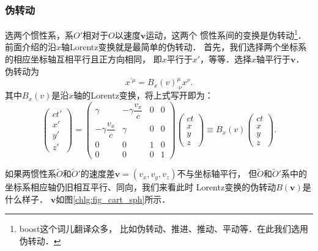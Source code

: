 \subsubsection{伪转动}
选两个惯性系，系$O'$相对于$O$以速度$\boldsymbol{v}$运动，这两个
惯性系间的变换是伪转动{\footnote{boost这个词儿翻译众多，
        比如伪转动、推进、推动、平动等．在此我们选用伪转动．}}．
前面介绍的沿$x$轴Lorentz变换就是最简单的伪转动．
首先，我们选择两个坐标系的相应坐标轴互相平行且正方向相同，
即$x$平行于$x'$，等等．选择$x$轴平行于$\boldsymbol{v}$．
伪转动为
\begin{equation}\label{chlg:eqn_lorentz-matrix-b}
    x^{\prime \mu} = B_x({v}) ^\mu _{\cdot \nu} x^\nu .
\end{equation}
其中$B_x({v})$是沿$x$轴的Lorentz变换，将上式写开即为：
\begin{equation}\label{chlg:eqn_lorentz-transofrm-x-MatrixForm}
	\begin{pmatrix}
		ct'\\x'\\y'\\z'
	\end{pmatrix} =
	\begin{pmatrix}
		\gamma & -\gamma \dfrac{v_x}{c}  & 0 & 0 \\
		-\gamma \dfrac{v_x}{c} & \gamma  & 0 & 0 \\
		0 & 0 & 1 & 0 \\
		0 & 0 & 0 & 1
	\end{pmatrix}
	\begin{pmatrix}
		ct\\x\\y\\z
	\end{pmatrix} \equiv B_x({v})
	\begin{pmatrix}
		ct\\x\\y\\z
	\end{pmatrix}.
\end{equation}





如果两惯性系$\tilde{O}$和$\tilde{O}'$的速度差$\boldsymbol{v}=(v_x,v_y,v_z)$不与坐标轴平行，
但$\tilde{O}$和$\tilde{O}'$系中的坐标系相应轴仍旧相互平行、同向，我们来看此时
Lorentz变换的伪转动$B(\boldsymbol{v})$是什么样子．
$\boldsymbol{v}$如图\ref{chlg:fig_cart_sph}所示．

